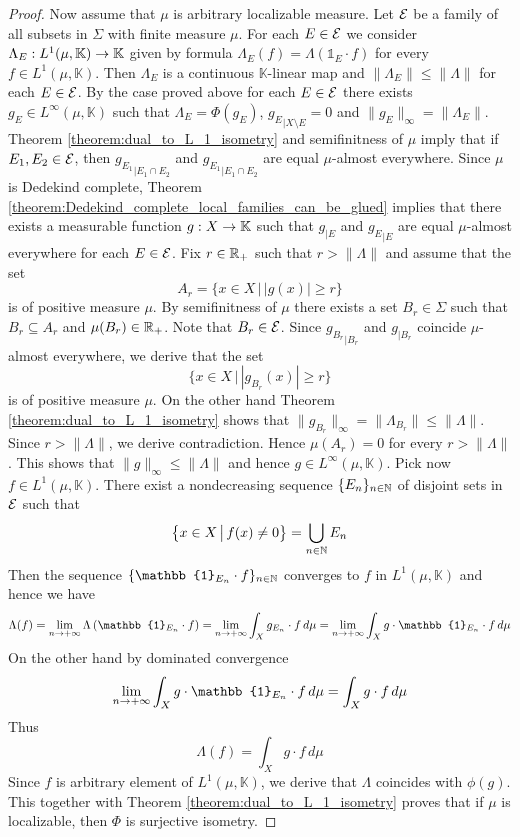 \begin{proof}
  Now assume that $\mu$ is arbitrary localizable measure. Let ${\mathcal E}$ be a family of all subsets in $\Sigma$ with finite measure $\mu$. For each $E \in {\mathcal E}$ we consider $\Lambda_E:L^1(\mu,\mathbb{K})\rightarrow \mathbb{K}$ given by formula $\Lambda_E(f) = \Lambda(\mathbb{1}_E\cdot f)$ for every $f \in L^1(\mu,\mathbb{K})$. Then $\Lambda_E$ is a continuous $\mathbb{K}$-linear map and $\lVert \Lambda_E \rVert \leq \lVert \Lambda \rVert$ for each $E \in {\mathcal E}$. By the case proved above for each $E \in {\mathcal E}$ there exists $g_E \in L^{\infty}(\mu,\mathbb{K})$ such that $\Lambda_E = \Phi(g_E)$, ${g_E}_{\mid X\setminus E} = 0$ and $\lVert g_E \rVert_{\infty} = \lVert \Lambda_E \rVert$. Theorem \ref{theorem:dual_to_L_1_isometry} and semifinitness of $\mu$ imply that if $E_1,E_2 \in {\mathcal E}$, then ${g_{E_1}}_{\mid E_1 \cap E_2}$ and ${g_{E_1}}_{\mid E_1 \cap E_2}$ are equal $\mu$-almost everywhere. Since $\mu$ is Dedekind complete, Theorem \ref{theorem:Dedekind_complete_local_families_can_be_glued} implies that there exists a measurable function $g:X\rightarrow \mathbb{K}$ such that $g_{\mid E}$ and ${g_E}_{\mid E}$ are equal $\mu$-almost everywhere for each $E \in {\mathcal E}$. Fix $r \in {\mathbb R}_+$ such that $r > \lVert \Lambda \rVert$ and assume that the set
  $$A_r =\big\{x\in X\,\big|\,|g(x)| \geq r\big\}$$
  is of positive measure $\mu$. By semifinitness of $\mu$ there exists a set $B_r \in \Sigma$ such that $B_r \subseteq A_r$ and $\mu(B_r) \in {\mathbb R}_+$. Note that $B_r \in {\mathcal E}$. Since ${g_{B_r}}_{\mid B_r}$ and $g_{\mid B_r}$ coincide $\mu$-almost everywhere, we derive that the set
  $$\big\{x\in X\,\big|\,|g_{B_r}(x)| \geq r\big\}$$ 
  is of positive measure $\mu$. On the other hand Theorem \ref{theorem:dual_to_L_1_isometry} shows that $\lVert g_{B_r}\rVert_{\infty} = \lVert \Lambda_{B_r}\rVert \leq \lVert \Lambda \rVert$. Since $r > \lVert \Lambda \rVert$, we derive contradiction. Hence $\mu(A_r) = 0$ for every $r > \lVert \Lambda \rVert$. This shows that $\lVert g \rVert_{\infty} \leq \lVert \Lambda \rVert$ and hence $g \in L^{\infty}(\mu,\mathbb{K})$. Pick now $f \in L^1(\mu,\mathbb{K})$. There exist a nondecreasing sequence $\{E_n\}_{n\in {\mathbb N}}$ of disjoint sets in ${\mathcal E}$ such that
  $$\big\{x\in X\,\big|\,f(x) \neq 0\big\} = \bigcup_{n\in {\mathbb N}}E_n$$
  Then the sequence $\{\mathbb{1}_{E_n}\cdot f\}_{n \in \NN}$ converges to $f$ in $L^1(\mu,\mathbb{K})$ and hence we have
  $$\Lambda(f) = \lim_{n\ra +\infty}\Lambda\left(\mathbb{1}_{E_n}\cdot f\right) = \lim_{n\ra +\infty}\int_Xg_{E_n}\cdot f\,d\mu = \lim_{n\ra +\infty}\int_Xg \cdot\mathbb{1}_{E_n}\cdot  f\,d\mu$$
  On the other hand by dominated convergence
  $$\lim_{n\ra +\infty}\int_Xg \cdot\mathbb{1}_{E_n}\cdot  f\,d\mu = \int_Xg\cdot f\,d\mu$$
  Thus 
  $$\Lambda(f) = \int_Xg\cdot f\,d\mu$$
  Since $f$ is arbitrary element of $L^1(\mu,\mathbb{K})$, we derive that $\Lambda$ coincides with $\phi(g)$. This together with Theorem \ref{theorem:dual_to_L_1_isometry} proves that if $\mu$ is localizable, then $\Phi$ is surjective isometry.


\end{proof}
